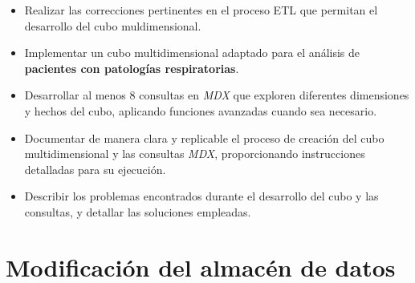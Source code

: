 \documentclass[12pt, a4paper, twoside]{article}
\begin{document}
	\begin{itemize}
		\item Realizar las correcciones pertinentes en el proceso ETL que permitan el desarrollo del cubo muldimensional.
		\item Implementar un cubo multidimensional adaptado para el análisis de \textbf{pacientes con patologías respiratorias}.
		\item Desarrollar al menos 8 consultas en \textit{MDX} que exploren diferentes dimensiones y hechos del cubo, aplicando funciones avanzadas cuando sea necesario.
		\item Documentar de manera clara y replicable el proceso de creación del cubo multidimensional y las consultas \textit{MDX}, proporcionando instrucciones detalladas para su ejecución.
		\item Describir los problemas encontrados durante el desarrollo del cubo y las consultas, y detallar las soluciones empleadas.
	\end{itemize}
	
	
	 
	
	\section{\textbf{Modificación del almacén de datos}}
	
\end{document}
